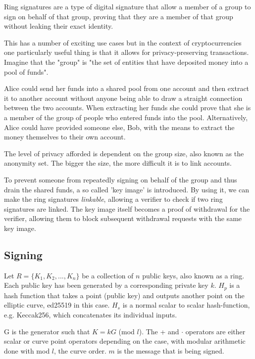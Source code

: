 \documentclass[9pt]{article}
\begin{document}
Ring signatures are a type of digital signature that allow a member of a group to sign on behalf of that group, proving that they are a member of that group without leaking their exact identity. 

This has a number of exciting use cases but in the context of cryptocurrencies one particularly useful thing is that it allows for privacy-preserving transactions. Imagine that the "group" is "the set of entities that have deposited money into a pool of funds".

Alice could send her funds into a shared pool from one account and then extract it to another account without anyone being able to draw a straight connection between the two accounts. When extracting her funds she could prove that she is a member of the group of people who entered funds into the pool. Alternatively, Alice could have provided someone else, Bob, with the means to extract the money themselves to their own account.

The level of privacy afforded is dependent on the group size, also known as the anonymity set. The bigger the size, the more difficult it is to link accounts.

To prevent someone from repeatedly signing on behalf of the group and thus drain the shared funds, a so called 'key image' is introduced. By using it, we can make the ring signatures \textit{linkable}, allowing a verifier to check if two ring signatures are linked. The key image itself becomes a proof of withdrawal for the verifier, allowing them to block subsequent withdrawal requests with the same key image.


\subsection{Signing}
Let $R = \{K_1, K_2, ..., K_n\}$ be a collection of $n$ public keys, also known as a ring. Each public key has been generated by a corresponding private key $k$. $H_p$ is a hash function that takes a point (public key) and outputs another point on the elliptic curve, ed25519 in this case. $H_s$ is a normal scalar to scalar hash-function, e.g. Keccak256, which concatenates its individual inputs. 

G is the generator such that $K = k G$ (mod $l$). The + and $\cdot$ operators are either scalar or curve point operators depending on the case, with modular arithmetic done with mod $l$, the curve order. $m$ is the message that is being signed.
\end{document}
